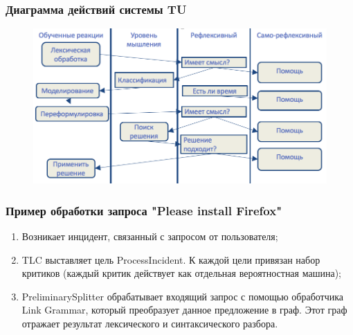 \documentclass[14pt]{beamer}
\begin{document}
\begin{frame}
\frametitle{Диаграмма действий системы TU}
\begin{figure} [h] 
  \center
  \includegraphics [scale=0.35] {ShortLefecycle}
  \label{img:ShortLefecycle}  
\end{figure}
\end{frame}


\begin{frame}
\frametitle{Пример обработки запроса "Please install Firefox"}
\begin{enumerate}
	\item Возникает инцидент, связанный с запросом от пользователя;
	\item TLC выставляет цель ProcessIncident. К каждой цели привязан набор критиков (каждый критик действует как отдельная вероятностная машина);
	\item PreliminarySplitter обрабатывает входящий запрос с помощью обработчика Link Grammar, который преобразует данное предложение в граф. Этот граф отражает результат лексического и синтаксического разбора.
\end{enumerate}
\end{frame}
\end{document}
